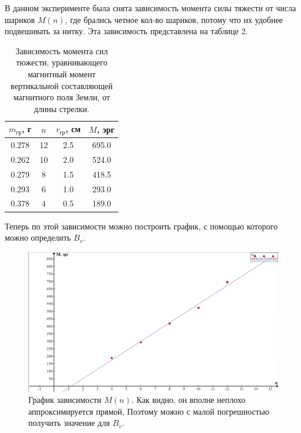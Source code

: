 \documentclass[a4paper, 14pt]{extarticle}%
\newcommand\ECaption[1]{%
     \captionsetup{font=footnotesize}%
     \caption{#1}}
\begin{document}
В данном эксперименте была снята зависимость момента силы тяжести от числа шариков $M(n)$, где брались четное кол-во шариков, потому что их удобнее подвешивать за нитку. Эта зависимость представлена на таблице 
2.

\begin{table}[h]
\begin{center}
\begin{tabular}{|c|c|c|c|}
\hline
\rowcolor[HTML]{9698ED} 
$m_{\text{гр}}$, г & $n$ & $r_{\text{гр}}$, см & $M$, эрг     \\ \hline
0.278           & 12  & 2.5               & 695.0  \\ \hline
\rowcolor[HTML]{9698ED} 
0.262           & 10  & 2.0             & 524.0 \\ \hline
0.279           & 8   & 1.5             & 418.5 \\ \hline
\rowcolor[HTML]{9698ED} 
0.293           & 6   & 1.0             & 293.0 \\ \hline
0.378           & 4   & 0.5             & 189.0   \\ \hline
\end{tabular}
\ECaption{Зависимость момента сил тюжести, уравнивающего магнитный момент вертикальной составляющей магнитного поля Земли, от длины стрелки. }
\end{center}
\end{table}

Теперь по этой зависимости можно построить график, с помощью которого можно определить $B_v$.

\begin{figure}[h!]
\begin{center}
\includegraphics[width=1\textwidth]{pics/lab1232.png}
\end{center}
\ECaption{График зависимости $M(n)$. Как видно, он вполне неплохо аппроксимируется прямой, Поэтому можно с малой погрешностью получить значение для  $B_v$. }
\end{figure}
\end{document}
